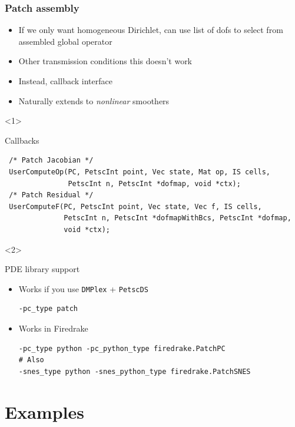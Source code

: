\documentclass[presentation,aspectratio=43,10pt]{beamer}
\begin{document}
\begin{frame}[fragile,t]
  \frametitle{Patch assembly}
  \begin{itemize}
  \item If we only want homogeneous Dirichlet, can use list of dofs to
    select from assembled global operator
  \item Other transmission conditions this doesn't work
  \item Instead, callback interface
  \item Naturally extends to \emph{nonlinear} smoothers
  \end{itemize}

  \begin{onlyenv}<1>
    \begin{block}{Callbacks}
\begin{verbatim}
 /* Patch Jacobian */
 UserComputeOp(PC, PetscInt point, Vec state, Mat op, IS cells, 
               PetscInt n, PetscInt *dofmap, void *ctx);
 /* Patch Residual */
 UserComputeF(PC, PetscInt point, Vec state, Vec f, IS cells, 
              PetscInt n, PetscInt *dofmapWithBcs, PetscInt *dofmap,
              void *ctx);
\end{verbatim}
    \end{block}
  \end{onlyenv}
  \begin{onlyenv}<2>
    \begin{block}{PDE library support}
      \begin{itemize}
      \item Works if you use \texttt{DMPlex} + \texttt{PetscDS}
\begin{verbatim}
-pc_type patch
\end{verbatim}
      \item Works in Firedrake
\begin{verbatim}
-pc_type python -pc_python_type firedrake.PatchPC
# Also
-snes_type python -snes_python_type firedrake.PatchSNES
\end{verbatim}
      \end{itemize}
    \end{block}
  \end{onlyenv}
\end{frame}

\section{Examples}
\end{document}
